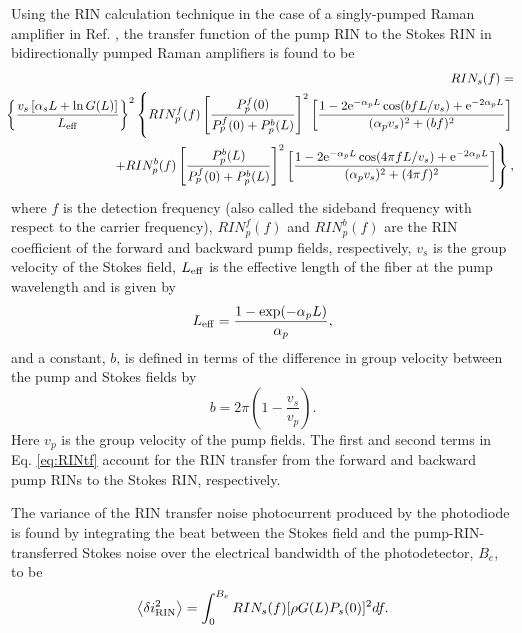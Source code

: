 \documentclass[10pt,letterpaper]{article}
\begin{document}
Using the RIN calculation technique in the case of a singly-pumped Raman amplifier in Ref. \cite{fludger2001jlightwavetechnol}, the transfer function of the pump RIN to the Stokes RIN in bidirectionally pumped Raman amplifiers is found to be
\begin{eqnarray}
&&\hspace{-0.7cm}RIN_s(f) = \nonumber\\
&&\hspace{-0.5cm}\left\{\frac{v_s\left[\alpha_s L + \ln G(L)\right]}{L_{\rm eff}}\right\}^2  
 \left\{RIN_p^f(f) \left[\frac{P_p^f(0)}{P_p^f(0)+P_p^b(L)}\right]^2 \left[\frac{1-2\mathrm{e}^{-\alpha_p L}\cos(bfL/v_s)+\mathrm{e}^{-2 \alpha_p L}}{(\alpha_p v_s)^2+(b f)^2}\right] \right.\nonumber\\
&&\hspace{-0.5cm} \left.+RIN_p^b(f) \left[\frac{P_p^b(L)}{P_p^f(0)+P_p^b(L)}\right]^2 \left[\frac{1-2\mathrm{e}^{-\alpha_p L}\cos(4 \pi f L/v_s)+\mathrm{e}^{-2 \alpha_p L}}{(\alpha_p v_s)^2+(4 \pi f)^2}\right]\right\}, 
\label{eq:RINtf}
\end{eqnarray}
where $f$ is the detection frequency (also called the sideband frequency with respect to the carrier frequency), $RIN_p^f(f)$ and $RIN_p^b(f)$ are the RIN coefficient of the forward and backward pump fields, respectively, $v_s$ is the group velocity of the Stokes field, $L_{\rm eff}$ is the effective length of the fiber at the pump wavelength and is given by
\begin{equation}
L_{\rm eff}=\frac{1-\exp(-\alpha_p L)}{\alpha_p},
\end{equation}
and a constant, $b$, is defined in terms of the difference in group velocity between the pump and Stokes fields by  
\begin{equation}
b=2\pi\left(1-\frac{v_s}{v_p}\right).
\end{equation}
Here $v_p$ is the group velocity of the pump fields. The first and second terms in Eq. \ref{eq:RINtf} account for the RIN transfer from the forward and backward pump RINs to the Stokes RIN, respectively. 

The variance of the RIN transfer noise photocurrent produced by the photodiode is found by integrating the beat between the Stokes field and the pump-RIN-transferred Stokes noise over the electrical bandwidth of the photodetector, $B_e$, to be
\begin{equation}
\left\langle \delta i_{\rm RIN}^2\right\rangle=\int_0^{B_e}RIN_s(f) [\rho G(L) P_s(0)]^2 df.
\label{eq:RIN}
\end{equation}
\end{document}
